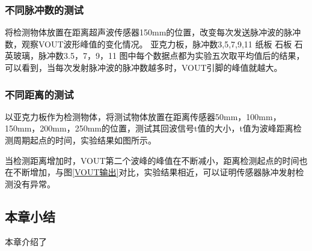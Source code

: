 \subsubsection{不同脉冲数的测试}
将检测物体放置在距离超声波传感器150mm的位置，改变每次发送脉冲波的脉冲数，观察VOUT波形峰值的变化情况。
亚克力板，脉冲数3,5,7,9,11
纸板
石板
石英玻璃，脉冲数3.5，7，9，11
图中每个数据点都为实验五次取平均值后的结果，可以看到，当每次发射脉冲波的脉冲数越多时，VOUT引脚的峰值就越大。



\subsubsection{不同距离的测试}
以亚克力板作为检测物体，将测试物体放置在距离传感器50mm，100mm，150mm，200mm，250mm的位置，测试其回波信号t值的大小，t值为波峰距离检测周期起点的时间，实验结果如图所示。


当检测距离增加时，VOUT第二个波峰的峰值在不断减小，距离检测起点的时间也在不断增加，与图\ref{VOUT输出}对比，实验结果相近，可以证明传感器脉冲发射检测没有异常。
\subsection{本章小结}
本章介绍了